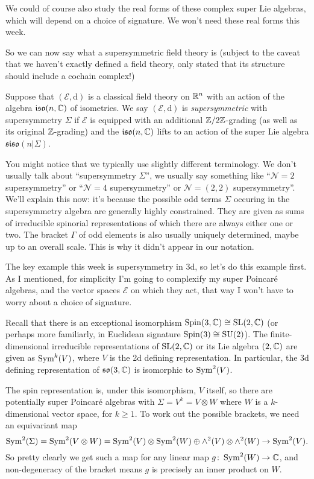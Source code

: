 \begin{remark}
	We could of course also study the real forms of these complex super Lie algebras, which will depend on a choice of signature.  We won't need these real forms this week.
\end{remark}

So we can now say what a supersymmetric field theory is (subject to the caveat that we haven't exactly defined a field theory, only stated that its structure should include a cochain complex!)
\begin{Definition}
	Suppose that $(\mathcal E,\mathrm{d})$ is a classical field theory on $\mathbb{R}^n$ with an action of the algebra $\mathfrak{iso}(n,\mathbb{C})$ of isometries.  We say $(\mathcal E,\mathrm{d})$ is \emph{supersymmetric} with supersymmetry $\Sigma$ if $\mathcal E$ is equipped with an additional $\mathbb{Z}/2\mathbb{Z}$-grading (as well as its original $\mathbb{Z}$-grading) and the $\mathfrak{iso}(n,\mathbb{C})$ lifts to an action of the super Lie algebra $\mathfrak{siso}(n|\Sigma)$.
\end{Definition}

You might notice that we typically use slightly different terminology.  We don't usually talk about ``supersymmetry $\Sigma$'', we usually say something like ``$\mathcal N=2$ supersymmetry'' or ``$\mathcal N=4$ supersymmetry'' or $\mathcal N=(2,2)$ supersymmetry''.  We'll explain this now: it's because the possible odd terms $\Sigma$ occuring in the supersymmetry algebra are generally highly constrained.  They are given as sums of irreducible spinorial representations of which there are always either one or two.  The bracket $\Gamma$ of odd elements is also usually uniquely determined, maybe up to an overall scale.  This is why it didn't appear in our notation.

\begin{example}[3d supersymmetry]
	The key example this week is supersymmetry in 3d, so let's do this example first.  As I mentioned, for simplicity I'm going to complexify my super Poincar\'e algebras, and the vector spaces $\mathcal E$ on which they act, that way I won't have to worry about a choice of signature.
	
	Recall that there is an exceptional isomorphism $\mathrm{Spin}(3,\mathbb{C}) \cong \mathrm{SL}(2,\mathbb{C})$ (or perhaps more familiarly, in Euclidean signature $\mathrm{Spin}(3) \cong \mathrm{SU}(2)$).  The finite-dimensional irreducible representations of $\mathrm{SL}(2,\mathbb{C})$ or its Lie algebra $\sl(2,\mathbb{C})$ are given as $\operatorname{Sym}^k(V)$, where $V$ is the 2d defining representation.  In particular, the 3d defining representation of $\mathfrak{so}(3,\mathbb{C})$ is isomorphic to $\operatorname{Sym}^2(V)$.
	
	The spin representation is, under this isomorphism, $V$ itself, so there are potentially super Poincar\'e algebras with $\Sigma = V^k = V \otimes W$ where $W$ is a $k$-dimensional vector space, for $k \ge 1$.  To work out the possible brackets, we need an equivariant map
	\[\operatorname{Sym}^2(\Sigma) = \operatorname{Sym}^2(V \otimes W) = \operatorname{Sym}^2(V) \otimes\operatorname{Sym}^2(W) \oplus \wedge^2(V) \otimes \wedge^2(W) \to \operatorname{Sym}^2(V).\]
	So pretty clearly we get such a map for any linear map $g \colon \operatorname{Sym}^2(W) \to \mathbb{C}$, and non-degeneracy of the bracket means $g$ is precisely an inner product on $W$.
	
\end{example}

